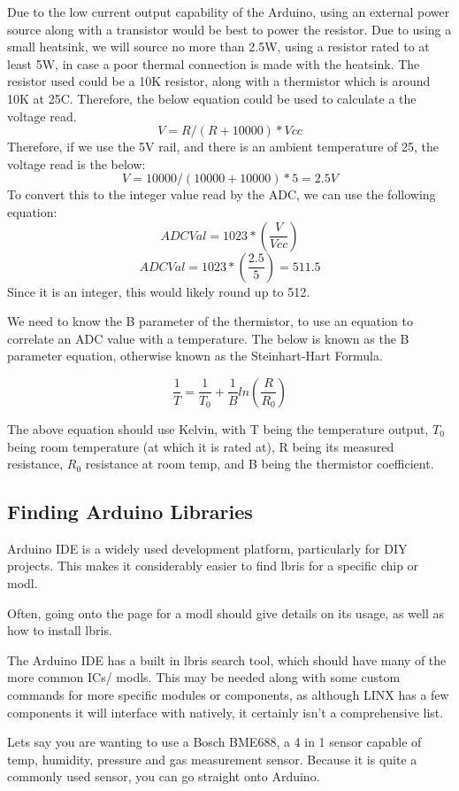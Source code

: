 \documentclass[a4paper,11pt]{report}
\begin{document}
Due to the low current output capability of the Arduino, using an external power source along with a transistor would be best to power the resistor. Due to using a small heatsink, we will source no more than 2.5W, using a resistor rated to at least 5W, in case a poor thermal connection is made with the heatsink. The resistor used could be a 10K resistor, along with a thermistor which is around 10K at 25\degree C. Therefore, the below equation could be used to calculate a the voltage read.
\[V = R / (R + 10000) * Vcc\]
Therefore, if we use the 5V rail, and there is an ambient temperature of 25, the voltage read is the below:
\[V = 10000/(10000+10000) * 5 = 2.5V\]
To convert this to the integer value read by the ADC, we can use the following equation:
\[ADCVal = 1023*(\frac{V}{Vcc})\]
\[ADCVal = 1023*(\frac{2.5}{5}) = 511.5\]
Since it is an integer, this would likely round up to 512.

We need to know the B parameter of the thermistor, to use an equation to correlate an ADC value with a temperature. The below is known as the B parameter equation, otherwise known as the Steinhart-Hart Formula.

\[\frac{1}{T} = \frac{1}{T_0} + \frac{1}{B}ln(\frac{R}{R_0})\]

The above equation should use Kelvin, with T being the temperature output, $T_0$ being room temperature (at which it is rated at), R being its measured resistance, $R_0$ resistance at room temp, and B being the thermistor coefficient.

\subsection{Finding Arduino Libraries}

Arduino IDE is a widely used development platform, particularly for DIY projects. This makes it considerably easier to find \gls{lbris} for a specific chip or \gls{modl}.

Often, going onto the page for a \gls{modl} should give details on its usage, as well as how to install \gls{lbris}.

The Arduino IDE has a built in \gls{lbris} search tool, which should have many of the more common ICs/ \gls{modl}s. This may be needed along with some custom commands for more specific modules or components, as although LINX has a few components it will interface with natively, it certainly isn't a comprehensive list.

Lets say you are wanting to use a Bosch BME688, a 4 in 1 sensor capable of temp, humidity, pressure and gas measurement sensor. Because it is quite a commonly used sensor, you can go straight onto Arduino.
\end{document}
